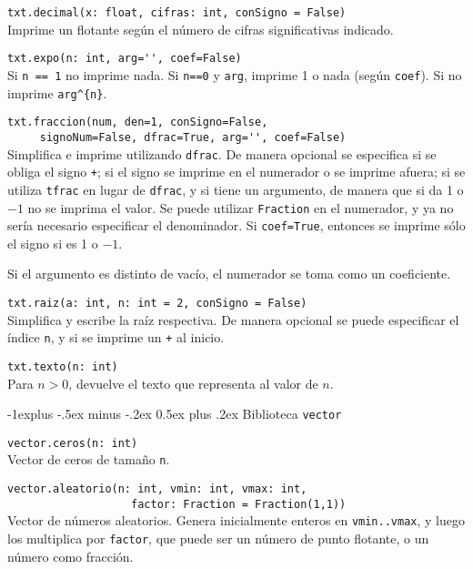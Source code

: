 \documentclass[10pt,landscape]{article}
\makeatletter
\renewcommand{\subsection}{\@startsection{subsection}{2}{0mm}%
                                {-1explus -.5ex minus -.2ex}%
                                {0.5ex plus .2ex}%
                                {\normalfont\normalsize\bfseries}}
\makeatother
\begin{document}
\begin{multicols}{3}
\begin{asparaitem}
\item \verb|txt.decimal(x: float, cifras: int, conSigno = False)| \\
\quad Imprime un flotante según el n\'umero de cifras significativas indicado.

\item \verb|txt.expo(n: int, arg='', coef=False)| \\
  \quad Si \verb|n == 1| no imprime nada. Si \verb|n==0| y \verb|arg|, imprime 1 o nada (seg\'un \verb|coef|). Si no imprime \verb|arg^{n}|.

\item \verb|txt.fraccion(num, den=1, conSigno=False,|\\
      \verb|     signoNum=False, dfrac=True, arg='', coef=False)| \\
  \quad Simplifica e imprime utilizando \verb|dfrac|. De manera opcional se especifica si se obliga el signo \verb|+|; si el signo se imprime en el numerador o se imprime afuera; si se utiliza \verb|tfrac| en lugar de \verb|dfrac|, y si tiene un argumento, de manera que si da 1 o $-1$ no se imprima el valor. Se puede utilizar \verb|Fraction| en el numerador, y ya no ser\'ia necesario especificar el denominador. Si \verb|coef=True|, entonces se imprime sólo el signo si es 1 o $-1$.

Si el argumento es distinto de vac\'io, el numerador se toma como un coeficiente.

\item  \verb|txt.raiz(a: int, n: int = 2, conSigno = False)| \\
\quad Simplifica y escribe la raíz respectiva. De manera opcional se puede especificar el \'indice \verb|n|, y si se imprime un \verb|+| al inicio.

\item \verb|txt.texto(n: int)| \\
\quad Para $n > 0$, devuelve el texto que representa al valor de $n$.
\end{asparaitem}

\subsection{Biblioteca \texttt{vector}}
\begin{asparaitem}
\item \verb|vector.ceros(n: int)| \\
\quad Vector de ceros de tamaño \verb|n|. 

\item \verb|vector.aleatorio(n: int, vmin: int, vmax: int,| \\
  \verb|                   factor: Fraction = Fraction(1,1))| \\
  \quad Vector de números aleatorios. Genera inicialmente enteros en \verb|vmin..vmax|, y luego los multiplica por \verb|factor|, que puede ser un n\'umero de punto flotante, o un n\'umero como fracci\'on.


\end{asparaitem}
\end{multicols}
\end{document}
